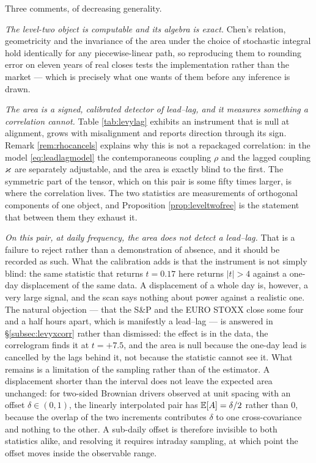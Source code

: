 
Three comments, of decreasing generality.

\emph{The level-two object is computable and its algebra is exact.}  Chen's relation, geometricity
and the invariance of the area under the choice of stochastic integral hold identically for any
piecewise-linear path, so reproducing them to rounding error on eleven years of real closes tests
the implementation rather than the market --- which is precisely what one wants of them before any
inference is drawn. 

\emph{The area is a signed, calibrated detector of lead--lag, and it measures something a
correlation cannot.} Table \ref{tab:levylag} exhibits an instrument that is null at alignment,
grows with misalignment and reports direction through its sign. Remark \ref{rem:rhocancels} explains
why this is not a repackaged correlation: in the model \eqref{eq:leadlagmodel} the contemporaneous
coupling $\rho$ and the lagged coupling $\varkappa$ are separately adjustable, and the area is exactly
blind to the first. The symmetric part of the tensor, which on this pair is some fifty times larger,
is where the correlation lives. The two statistics are measurements of orthogonal components of one
object, and Proposition \ref{prop:leveltwofree} is the statement that between them they exhaust it.

\emph{On this pair, at daily frequency, the area does not detect a lead--lag.} That is a failure to
reject rather than a demonstration of absence, and it should be recorded as such. What the
calibration adds is that the instrument is not simply blind: the same statistic that returns
$t=0.17$ here returns $|t|>4$ against a one-day displacement of the same data. A displacement of a
whole day is, however, a very large signal, and the scan says nothing about power against a
realistic one. The natural objection --- that the S\&P and the EURO STOXX close some four and a half
hours apart, which is manifestly a lead--lag --- is answered in \S\ref{subsec:levyxcorr} rather than
dismissed: the effect is in the data, the correlogram finds it at $t=+7.5$, and the area is null
because the one-day lead is cancelled by the lags behind it, not because the statistic cannot see
it. What remains is a limitation of the sampling rather than of the estimator. A displacement
shorter than the interval does not leave the expected area unchanged: for two-sided Brownian drivers
observed at unit spacing with an offset $\delta\in(0,1)$, the linearly interpolated pair has
$\mathbb{E}[A]=\delta/2$ rather than $0$, because the overlap of the two increments contributes $\delta$ to
one cross-covariance and nothing to the other. A sub-daily offset is therefore invisible to both
statistics alike, and resolving it requires intraday sampling, at which point the offset moves
inside the observable range. 


